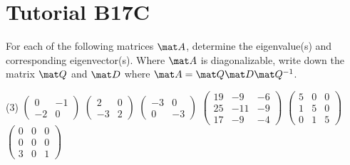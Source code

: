 \section{Tutorial B17C}

\begin{problem}
    For each of the following matrices $\mat A$, determine the eigenvalue(s) and corresponding eigenvector(s). Where $\mat A$ is diagonalizable, write down the matrix $\mat Q$ and $\mat D$ where $\mat A= \mat Q \mat D \mat Q^{-1}$.

    \begin{tasks}(3)
        \task $\begin{pmatrix}0 & -1 \\ -2 & 0\end{pmatrix}$
        \task $\begin{pmatrix}2 & 0 \\ -3 & 2\end{pmatrix}$
        \task $\begin{pmatrix}-3 & 0 \\ 0 & -3\end{pmatrix}$
        \task $\begin{pmatrix}19 & -9 & -6 \\ 25 & -11 & -9 \\ 17 & -9 & -4\end{pmatrix}$
        \task $\begin{pmatrix}5 & 0 & 0 \\ 1 & 5 & 0 \\ 0 & 1 & 5\end{pmatrix}$
        \task $\begin{pmatrix}0 & 0 & 0 \\ 0 & 0 & 0 \\ 3 & 0 & 1\end{pmatrix}$
    \end{tasks}
\end{problem}

